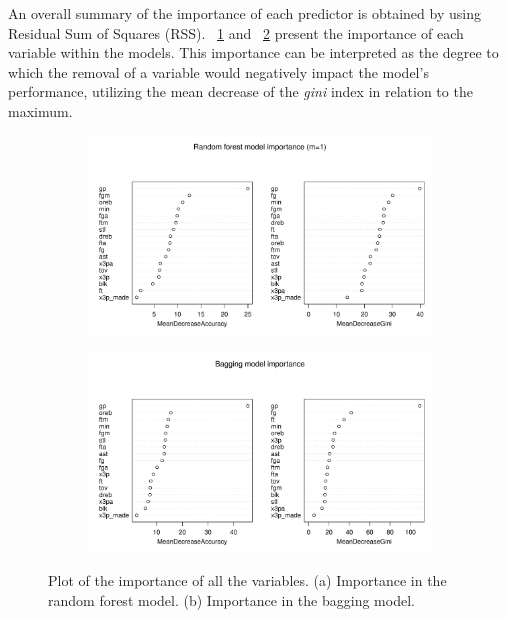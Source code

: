 An overall summary of the importance of each predictor is obtained by using Residual Sum of Squares (RSS). \Fig~\ref{fig:best_for_500_var_imp_plot} and \Fig~\ref{fig:bagg_500_var_imp_plot} present the importance of each variable within the models. This importance can be interpreted as the degree to which the removal of a variable would negatively impact the model's performance, utilizing the mean decrease of the \textit{gini} index in relation to the maximum.

\begin{figure}[H]
	\centering
	\begin{subfigure}{.5\textwidth}
		\centering
		\includegraphics[width=0.9\linewidth]{ImageFiles/Classification/Trees/best_for_500_var_imp_plot.pdf}
		\caption{}
		\label{fig:best_for_500_var_imp_plot}
	\end{subfigure}%
	\hfill
	\begin{subfigure}{.5\textwidth}
		\centering
		\includegraphics[width=0.9\linewidth]{ImageFiles/Classification/Trees/bagg_500_var_imp_plot.pdf}
		\caption{}
		\label{fig:bagg_500_var_imp_plot}
	\end{subfigure}
	\caption{Plot of the importance of all the variables. (a) Importance in the random forest model. (b) Importance in the bagging model.}
	\label{fig:ImpVar}
\end{figure}

